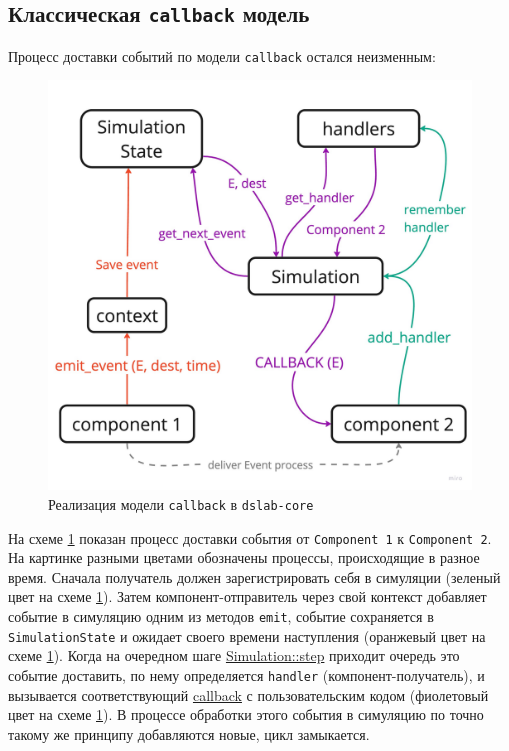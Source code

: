 \subsection{Классическая \texttt{callback} модель}
Процесс доставки событий по модели \texttt{callback} остался неизменным: 
\nopagebreak
\begin{figure}[H]
    \centering
    \includegraphics[width=0.7\linewidth]{images/dslab-core-callback.pdf}
    \caption{Реализация модели \texttt{callback} в \texttt{dslab-core}}
    \label{dslab_inner}
\end{figure}

На схеме \ref{dslab_inner} показан процесс доставки события от \texttt{Component~1} к \texttt{Component~2}. На картинке разными цветами обозначены процессы, происходящие в разное время. Сначала получатель должен зарегистрировать себя в симуляции (зеленый цвет на схеме \ref{dslab_inner}). Затем компонент-отправитель через свой контекст добавляет событие в симуляцию одним из методов \texttt{emit}, событие сохраняется в \texttt{SimulationState} и ожидает своего времени наступления (оранжевый цвет на схеме \ref{dslab_inner}). Когда на очередном шаге \hyperref[Simulation::step]{Simulation::step} приходит очередь это событие доставить, по нему определяется \texttt{handler} (компонент-получатель), и вызывается соответствующий \hyperref[fnon]{callback} с пользовательским кодом (фиолетовый цвет на схеме \ref{dslab_inner}). В процессе обработки этого события в симуляцию по точно такому же принципу добавляются новые, цикл замыкается.


